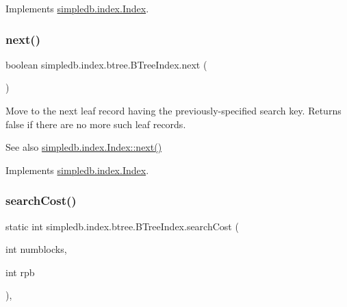 Implements \hyperlink{interfacesimpledb_1_1index_1_1Index_a7e72ba9fe47d6d7631e0ad3feee882d7}{simpledb.\+index.\+Index}.

\mbox{\label{classsimpledb_1_1index_1_1btree_1_1BTreeIndex_aa2629b173455d96fde28353e150da4f0}} 
\subsubsection{\texorpdfstring{next()}{next()}}
{\footnotesize\ttfamily boolean simpledb.\+index.\+btree.\+B\+Tree\+Index.\+next (\begin{DoxyParamCaption}{ }\end{DoxyParamCaption})\hspace{0.3cm}{\ttfamily [inline]}}

Move to the next leaf record having the previously-\/specified search key. Returns false if there are no more such leaf records. \begin{DoxySeeAlso}{See also}
\hyperlink{interfacesimpledb_1_1index_1_1Index_a38b2addb6813fbf1d94e77de2345724c}{simpledb.\+index.\+Index\+::next()} 
\end{DoxySeeAlso}


Implements \hyperlink{interfacesimpledb_1_1index_1_1Index_a38b2addb6813fbf1d94e77de2345724c}{simpledb.\+index.\+Index}.

\mbox{\label{classsimpledb_1_1index_1_1btree_1_1BTreeIndex_a2f22244ab4a024843d6fca8d74dcb2c1}} 
\subsubsection{\texorpdfstring{search\+Cost()}{searchCost()}}
{\footnotesize\ttfamily static int simpledb.\+index.\+btree.\+B\+Tree\+Index.\+search\+Cost (\begin{DoxyParamCaption}\item[{int}]{numblocks,  }\item[{int}]{rpb }\end{DoxyParamCaption})\hspace{0.3cm}{\ttfamily [inline]}, {\ttfamily [static]}}

